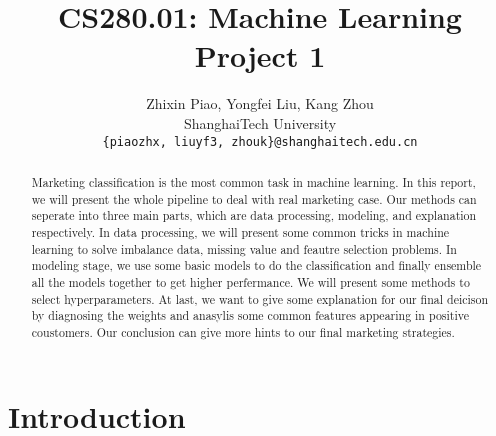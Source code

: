 \documentclass[10pt,twocolumn,letterpaper]{article}
\begin{document}
\title{CS280.01: Machine Learning\\ Project 1}

\author{Zhixin Piao, Yongfei Liu, Kang Zhou\\
ShanghaiTech University\\
{\tt\small { \{piaozhx, liuyf3, zhouk\}@shanghaitech.edu.cn}
}}

\maketitle

\begin{abstract}
   Marketing classification is the most common task in machine learning. In this report, we will present the whole pipeline to deal with real marketing case. Our methods can seperate into three main parts, which are data processing, modeling, and explanation respectively. In data processing, we will present some common tricks in machine learning to solve imbalance data, missing value and feautre selection problems. In modeling stage, we use some basic models to do the classification and finally ensemble all the models together to get higher perfermance. We will present some methods to select hyperparameters. At last, we want to give some explanation for our final deicison by diagnosing the weights and anasylis some common features appearing in positive coustomers. Our conclusion can give more hints to our final marketing strategies.
\end{abstract}

\section{Introduction}






{\small


}
\end{document}
